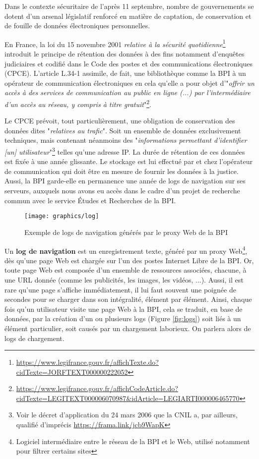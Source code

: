 \documentclass[symmetric,justified,marginals=raggedouter]{tufte-book}
\begin{document}
\noindent Dans le contexte sécuritaire de l'après 11 septembre, nombre de gouvernements se dotent d'un arsenal législatif renforcé en matière de captation, de conservation et de fouille de données électroniques personnelles. 

En France, la loi du 15 novembre 2001 \textit{relative à la sécurité quotidienne}\footnote{\url{https://www.legifrance.gouv.fr/affichTexte.do?cidTexte=JORFTEXT000000222052}} introduit le principe de rétention des données à des fins notamment d'enquêtes judiciaires et codifié dans le Code des postes et des communications électroniques (CPCE). L'article L.34-1 assimile, de fait, une bibliothèque comme la BPI à un opérateur de communication électroniques en cela qu'elle a pour objet d'"\textit{offrir un accès à des services de communication au public en ligne (...) par l'intermédiaire d'un accès au réseau, y compris à titre gratuit}"\footnote{\url{https://www.legifrance.gouv.fr/affichCodeArticle.do?cidTexte=LEGITEXT000006070987\&idArticle=LEGIARTI000006465770}}. 

Le CPCE prévoit, tout particulièrement, une obligation de conservation des données dites "\textit{relatives au trafic}". Soit un ensemble de données exclusivement techniques, mais contenant néanmoins des "\textit{informations permettant d'identifier [un] utili\-sateur}"\footnote{Voir le décret d'application du 24 mars 2006 que la CNIL a, par ailleurs, qualifié d'imprécis \url{https://frama.link/jcb9WapK}} telles qu'une adresse IP. La durée de rétention de ces données est fixée à une année glissante. Le stockage est lui effectué par et chez l'opé\-rateur de communication qui doit être en mesure de fournir les données à la justice. Aussi, la BPI garde-elle en permanence une année de logs de navigation sur ses serveurs, auxquels nous avons eu accès dans le cadre d'un projet de recherche commun avec le service Études et Recherches de la BPI.

\begin{figure*}
  \texttt{[image: graphics/log]}
  \caption{Exemple de logs de navigation générés par le proxy Web de la BPI}
  \label{fig:log}
\end{figure*}

\noindent Un \textbf{log de navigation} est un enregistrement texte, généré par un proxy Web\footnote{Logiciel intermédiaire entre le réseau de la BPI et le Web, utilisé notamment pour filtrer certains sites}, dès qu'une page Web est chargée sur l'un des postes Internet Libre de la BPI. Or, toute page Web est composée d'un ensemble de ressources associées, chacune, à une URL donnée (comme les publicités, les images, les vidéos, ...). Aussi, il est rare qu'une page s'affiche immédiatement, il lui faut souvent une poignée de secondes pour se charger dans son intégralité, élément par élément. Ainsi, chaque fois qu'un utilisateur visite une page Web à la BPI, cela se traduit, en base de données, par la création d'un ou plusieurs logs (Figure \ref{fig:logs}) soit liés à un élément particulier, soit causés par un chargement laborieux. On parlera alors de logs de chargement.
\end{document}
